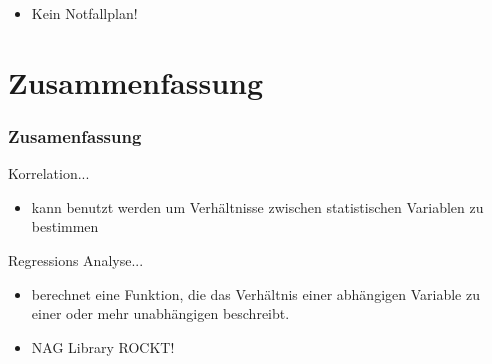 \documentclass{beamer}
\begin{document}
\begin{frame}

 \begin{itemize}
  \item<5> Kein Notfallplan!
 \end{itemize}

\end{frame}


\section{Zusammenfassung}

\begin{frame}
 \frametitle{Zusamenfassung}
 
 \begin{block}{Korrelation...}
  \begin{itemize}
   \item kann benutzt werden um Verh\"altnisse zwischen statistischen Variablen zu bestimmen
  \end{itemize}
 \end{block}

 \begin{block}{Regressions Analyse...}
  \begin{itemize}
   \item berechnet eine Funktion, die das Verh\"altnis einer abh\"angigen Variable zu einer oder mehr unabh\"angigen beschreibt.
  \end{itemize}
 \end{block}

 \begin{itemize}
  \item NAG Library ROCKT!
 \end{itemize}

\end{frame}
\end{document}
